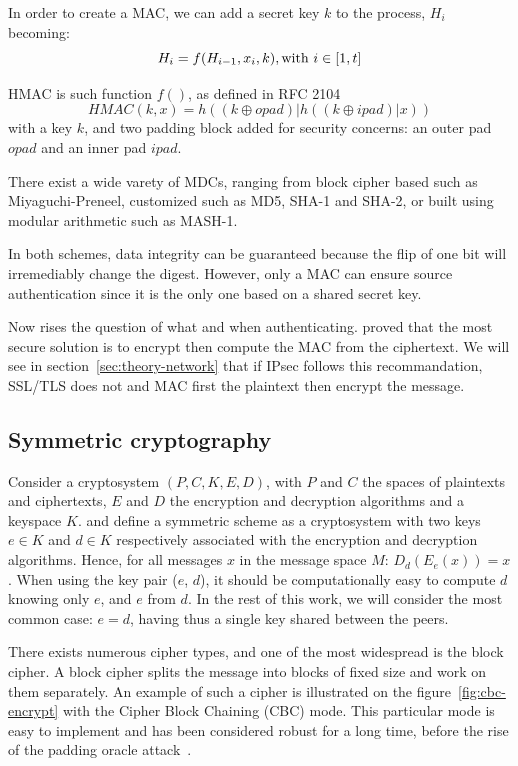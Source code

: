 In order to create a MAC, we can add a secret key $k$ to the process, $H_i$ becoming:
\[
	H_i = f(H_{i-1}, x_i, k), \mbox{with } i \in [1,t]\\
\]

HMAC is such function $f()$, as defined in RFC 2104~\cite{rfc2104}
\[
	HMAC(k, x) = h((k\oplus opad)|h((k\oplus ipad)|x))
\]
with a key $k$, and two padding block added for security concerns: an outer pad $opad$ and an inner pad $ipad$.

\noindent There exist a wide varety of MDCs, ranging from block cipher based such as Miyaguchi-Preneel, customized such as MD5, SHA-1 and SHA-2, or built using modular arithmetic such as MASH-1.

In both schemes, data integrity can be guaranteed because the flip of one bit will irremediably change the digest.
However, only a MAC can ensure source authentication since it is the only one based on a shared secret key.

Now rises the question of what and when authenticating.
\citet{Bellare2000} proved that the most secure solution is to encrypt then compute the MAC from the ciphertext.
We will see in section~\ref{sec:theory-network} that if IPsec follows this recommandation, SSL/TLS does not and MAC first the plaintext then encrypt the message.











\subsection{Symmetric cryptography}\label{sec:symmetric}
Consider a cryptosystem $(P,C,K,E,D)$, with $P$ and $C$ the spaces of plaintexts and ciphertexts, $E$ and $D$ the encryption and decryption algorithms and a keyspace $K$.
\citet{Menezes1996} and \citet{infof405} define a symmetric scheme as a cryptosystem with two keys $e \in K$ and $d \in K$ respectively associated with the encryption and decryption algorithms.
Hence, for all messages $x$ in the message space $M$: $D_d(E_e(x)) = x$.
When using the key pair ($e$, $d$), it should be computationally easy to compute $d$ knowing only $e$, and $e$ from $d$.
In the rest of this work, we will consider the most common case: $e = d$, having thus a single key shared between the peers.

There exists numerous cipher types, and one of the most widespread is the block cipher.
A block cipher splits the message into blocks of fixed size and work on them separately.
An example of such a cipher is illustrated on the figure~\ref{fig:cbc-encrypt} with the Cipher Block Chaining (CBC) mode.
This particular mode is easy to implement and has been considered robust for a long time, before the rise of the padding oracle attack~\cite{vaudenay2002}.

